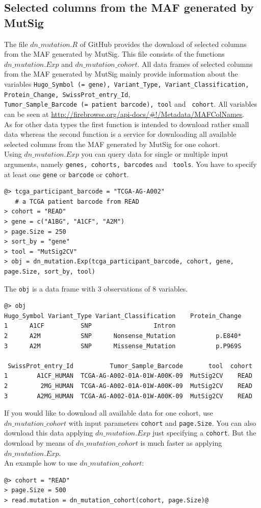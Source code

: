 \documentclass{TechReport}
\begin{document}
\subsection{Selected columns from the MAF generated by MutSig}
The file $dn\_mutation.R$ of GitHub provides the download of selected
columns from the MAF generated by MutSig. This file consists of the
functions $dn\_mutation.Exp$ and $dn\_mutation\_cohort$. All data
frames of selected columns from the MAF generated by MutSig mainly
provide information about the variables {\tt Hugo\_Symbol
  (= gene), Variant\_Type, Variant\_Classification, Protein\_Change, SwissProt\_entry\_Id}, \\
{\tt Tumor\_Sample\_Barcode (= patient barcode), tool} and {\tt
  cohort}. All variables can be seen at
\url{http://firebrowse.org/api-docs/#!/Metadata/MAFColNames}.\\
As for other data types the first function is intended to download
rather small data whereas the second function is a service for
downloading all available selected
columns from the MAF generated by MutSig for one cohort.\\
Using $dn\_mutation.Exp$ you can query data for single or multiple
input arguments, namely {\tt genes, cohorts, barcodes} and {\tt
  tools}. You have to specify at least one {\tt gene} or {\tt barcode}
or {\tt cohort}.

\begin{lstlisting}[style=base]
@> tcga_participant_barcode = "TCGA-AG-A002"
   # a TCGA patient barcode from READ
> cohort = "READ"
> gene = c("A1BG", "A1CF", "A2M")
> page.Size = 250
> sort_by = "gene"
> tool = "MutSig2CV"
> obj = dn_mutation.Exp(tcga_participant_barcode, cohort, gene, 
page.Size, sort_by, tool)
\end{lstlisting}
The {\tt obj} is a data frame with 3 observations of 8 variables.
\begin{lstlisting}[style=base]
@> obj
Hugo_Symbol Variant_Type Variant_Classification    Protein_Change 
1      A1CF          SNP                 Intron                        
2      A2M           SNP      Nonsense_Mutation           p.E840*         
3      A2M           SNP      Missense_Mutation           p.P969S   

 SwissProt_entry_Id          Tumor_Sample_Barcode       tool  cohort 
1        A1CF_HUMAN  TCGA-AG-A002-01A-01W-A00K-09  MutSig2CV    READ
2         2MG_HUMAN  TCGA-AG-A002-01A-01W-A00K-09  MutSig2CV    READ
3        A2MG_HUMAN  TCGA-AG-A002-01A-01W-A00K-09  MutSig2CV    READ     
\end{lstlisting}
 If you would like to download all available data for one cohort, use  
$dn\_mutation\_cohort$ with input parameters {\tt cohort} and {\tt page.Size}. 
You can also download this data applying $dn\_mutation.Exp$ just specifying 
a {\tt cohort}. But the download by means of $dn\_mutation\_cohort$ 
is much faster as applying $dn\_mutation.Exp$. \\
An example how to use $dn\_mutation\_cohort$:
\begin{lstlisting}[style=base]
@> cohort = "READ"
> page.Size = 500
> read.mutation = dn_mutation_cohort(cohort, page.Size)@
\end{lstlisting}
\end{document}
